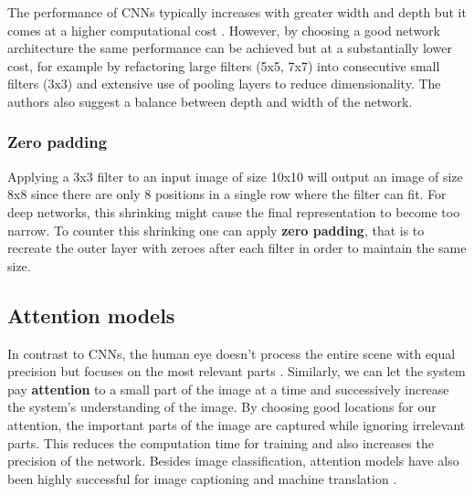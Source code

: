 The performance of CNNs typically increases with greater width and depth but it comes at a higher computational cost \cite{InceptionV3}. However, by choosing a good network architecture the same performance can be achieved but at a substantially lower cost, for example by refactoring large filters (5x5, 7x7) into consecutive small filters (3x3) and extensive use of pooling layers to reduce dimensionality. The authors also suggest a balance between depth and width of the network.

\subsubsection{Zero padding}

Applying a 3x3 filter to an input image of size 10x10 will output an image of size 8x8 since there are only 8 positions in a single row where the filter can fit. For deep networks, this shrinking might cause the final representation to become too narrow. To counter this shrinking one can apply \textbf{zero padding}, that is to recreate the outer layer with zeroes after each filter in order to maintain the same size.


\subsection{Attention models}



In contrast to CNNs, the human eye doesn't process the entire scene with equal precision but focuses on the most relevant parts \cite{DeepMindAttention}.
Similarly, we can let the system pay \textbf{attention} to a small part of the image at a time and successively increase the system's understanding of the image.
By choosing good locations for our attention, the important parts of the image are captured while ignoring irrelevant parts.
This reduces the computation time for training and also increases the precision of the network.
Besides image classification, attention models have also been highly successful for image captioning \cite{AttendAndTell} and machine translation \cite{machine_translation_attention}.

